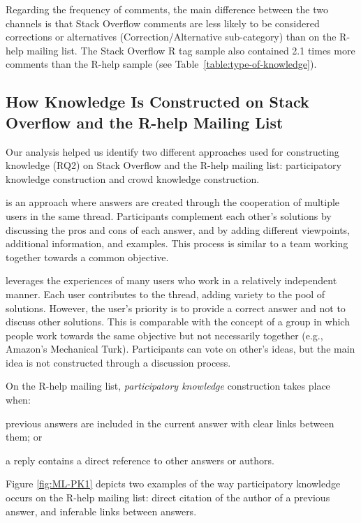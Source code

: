 \documentclass[smallextended]{svjour3}       %
\newcommand{\SO}{Stack Overflow\xspace}
\newcommand{\RH}{R-help\xspace}
\begin{document}
Regarding the frequency of comments, the main difference between the two channels is that \SO comments are less likely to be considered corrections or alternatives (Correction/Alternative sub-category) than on the \RH mailing list. The \SO R tag sample also contained 2.1 times more comments than the \RH sample (see Table~\ref{table:type-of-knowledge}).

\subsection{How Knowledge Is Constructed on \SO and the \RH Mailing List}
\label{sec:rq2}

Our analysis helped us identify two different approaches used for constructing knowledge (RQ2) on \SO and the \RH mailing list: participatory knowledge construction and crowd knowledge construction.

\begin{description}[itemsep=2pt, topsep=0pt, leftmargin=1em, parsep=0pt]
\item[\textbf{Participatory knowledge construction}] is an approach where answers are created through the cooperation of multiple users in the same thread. Participants complement each other's solutions by discussing the pros and cons of each answer, and by adding different viewpoints, additional information, and examples. This process is similar to a team working together towards a common objective.

\item[\textbf{Crowd knowledge construction}] leverages the experiences of many users who work in a relatively independent manner. Each user contributes to the thread, adding variety to the pool of solutions. However, the user's priority is to provide a correct answer and not to discuss other solutions. This is comparable with the concept of a group in which people work towards the same objective but not necessarily together (e.g., Amazon's Mechanical Turk). Participants can vote on other's ideas, but the main idea is not constructed through a discussion process.
\end{description}

On the \RH mailing list, \textit{participatory knowledge} construction takes place when:
\begin{enumerate*}[label=(\arabic*)]
  \item previous answers are included in the current answer with clear links between them; or
  \item a reply contains a direct reference to other answers or authors.
\end{enumerate*}
Figure \ref{fig:ML-PK1} depicts two examples of the way participatory knowledge occurs on the \RH mailing list: direct citation of the author of a previous answer, and inferable links between answers.
\end{document}
